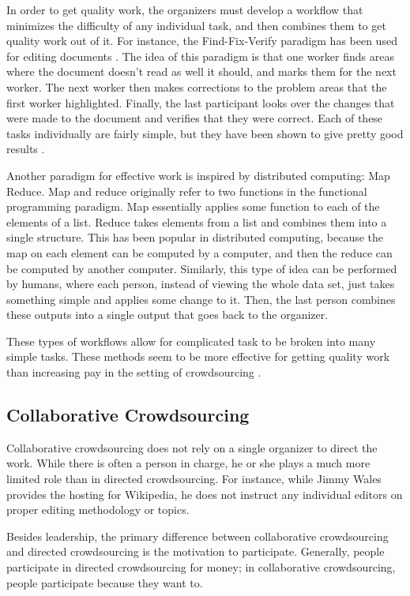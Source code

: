 In order to get quality work, the organizers must develop a workflow that minimizes the difficulty of any individual task, and then combines them to get quality work out of it. For instance, the Find-Fix-Verify paradigm has been used for editing documents \cite{crowdsourcing}. The idea of this paradigm is that one worker finds areas where the document doesn't read as well it should, and marks them for the next worker. The next worker then makes corrections to the problem areas that the first worker highlighted. Finally, the last participant looks over the changes that were made to the document and verifies that they were correct. Each of these tasks individually are fairly simple, but they have been shown to give pretty good results \cite{crowdsourcing}. 

Another paradigm for effective work is inspired by distributed computing: Map Reduce. Map and reduce originally refer to two functions in the functional programming paradigm. Map essentially applies some function to each of the elements of a list. Reduce takes elements from a list and combines them into a single structure. This has been popular in distributed computing, because the map on each element can be computed by a computer, and then the reduce can be computed by another computer. Similarly, this type of idea can be performed by humans, where each person, instead of viewing the whole data set, just takes something simple and applies some change to it. Then, the last person combines these outputs into a single output that goes back to the organizer.

These types of workflows allow for complicated task to be broken into many simple tasks. These methods seem to be more effective for getting quality work than increasing pay in the setting of crowdsourcing \cite{crowdsourcing}.

\subsection{Collaborative Crowdsourcing}
Collaborative crowdsourcing does not rely on a single organizer to direct the work. While there is often a person in charge, he or she plays a much more limited role than in directed crowdsourcing. For instance, while Jimmy Wales provides the hosting for Wikipedia, he does not instruct any individual editors on proper editing methodology or topics.

Besides leadership, the primary difference between collaborative crowdsourcing and directed crowdsourcing is the motivation to participate. Generally, people participate in directed crowdsourcing for money; in collaborative crowdsourcing, people participate because they want to. 

